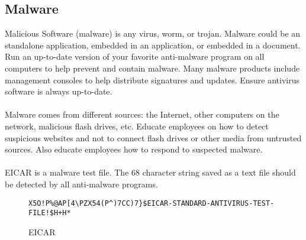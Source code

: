 \subsection{Malware}
Malicious Software (malware) is any virus, worm, or trojan. Malware could be an standalone application, embedded in an application, or embedded in a document. Run an up-to-date version of your favorite anti-malware program on all computers to help prevent and contain malware. Many malware products include management consoles to help distribute signatures and updates. Ensure antivirus software is always up-to-date.\\\\
Malware comes from different sources: the Internet, other computers on the network, malicious flash drives, etc. Educate employees on how to detect suspicious websites and not to connect flash drives or other media from untrusted sources. Also educate employees how to respond to suspected malware.\\\\
EICAR is a malware test file. The 68 character string saved as a text file should be detected by all anti-malware programs.
\begin{center}
\begin{figure}[ht]
\begin{verbatim}
X5O!P%@AP[4\PZX54(P^)7CC)7}$EICAR-STANDARD-ANTIVIRUS-TEST-FILE!$H+H*
\end{verbatim}
\caption{EICAR}
\end{figure}
\end{center}
